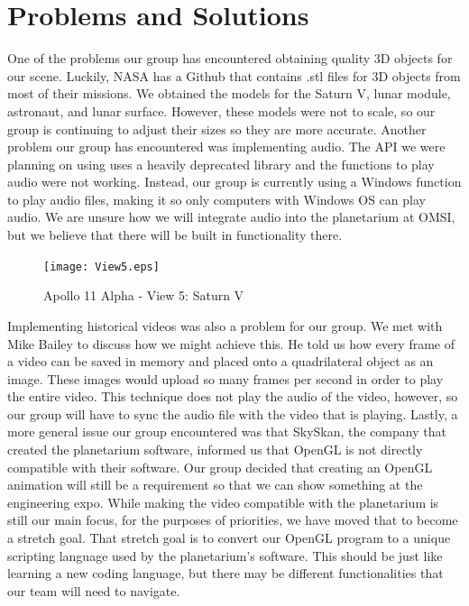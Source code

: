\documentclass[onecolumn, draftclsnofoot,10pt, compsoc]{IEEEtran}
\begin{document}
\section{Problems and Solutions}

One of the problems our group has encountered obtaining quality 3D objects for our scene. Luckily, NASA has a Github that contains .stl files for 3D objects from most of their missions. We obtained the models for the Saturn V, lunar module, astronaut, and lunar surface. However, these models were not to scale, so our group is continuing to adjust their sizes so they are more accurate. Another problem our group has encountered was implementing audio. The API we were planning on using uses a heavily deprecated library and the functions to play audio were not working. Instead, our group is currently using a Windows function to play audio files, making it so only computers with Windows OS can play audio. We are unsure how we will integrate audio into the planetarium at OMSI, but we believe that there will be built in functionality there. 

\begin{figure}
    \texttt{[image: View5.eps]}
    \caption{Apollo 11 Alpha - View 5: Saturn V}
    \label{fig:View 5}
\end{figure}

Implementing historical videos was also a problem for our group. We met with Mike Bailey to discuss how we might achieve this. He told us how every frame of a video can be saved in memory and placed onto a quadrilateral object as an image. These images would upload so many frames per second in order to play the entire video. This technique does not play the audio of the video, however, so our group will have to sync the audio file with the video that is playing. Lastly, a more general issue our group encountered was that SkySkan, the company that created the planetarium software, informed us that OpenGL is not directly compatible with their software. Our group decided that creating an OpenGL animation will still be a requirement so that we can show something at the engineering expo. While making the video compatible with the planetarium is still our main focus, for the purposes of priorities, we have moved that to become a stretch goal. That stretch goal is to convert our OpenGL program to a unique scripting language used by the planetarium's software. This should be just like learning a new coding language, but there may be different functionalities that our team will need to navigate. 
\end{document}
